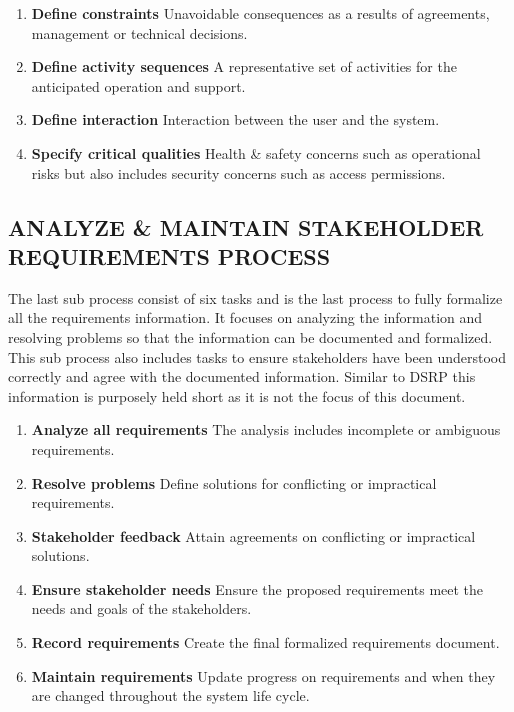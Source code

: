 \documentclass[conference]{IEEEtran}
\begin{document}
\begin{enumerate}
	\item \textbf{Define constraints} Unavoidable consequences as a results of agreements, management or technical decisions.
	\item \textbf{Define activity sequences} A representative set of activities for the anticipated operation and support.
	\item \textbf{Define interaction} Interaction between the user and the system.
	\item \textbf{Specify critical qualities} Health \& safety concerns such as operational risks but also includes security concerns such as access permissions.
\end{enumerate}

\subsection{ANALYZE \& MAINTAIN STAKEHOLDER REQUIREMENTS PROCESS}

The last sub process consist of six tasks and is the last process to fully formalize all the requirements information. It focuses on analyzing the information and resolving problems so that the information can be documented and formalized. This sub process also includes tasks to ensure stakeholders have been understood correctly and agree with the documented information. Similar to DSRP this information is purposely held short as it is not the focus of this document.

\begin{enumerate}
	\item \textbf{Analyze all requirements} The analysis includes incomplete or ambiguous requirements.
	\item \textbf{Resolve problems} Define solutions for conflicting or impractical requirements.
	\item \textbf{Stakeholder feedback} Attain agreements on conflicting or impractical solutions.
	\item \textbf{Ensure stakeholder needs} Ensure the proposed requirements meet the needs and goals of the stakeholders.
	\item \textbf{Record requirements} Create the final formalized requirements document.
	\item \textbf{Maintain requirements} Update progress on requirements and when they are changed throughout the system life cycle.
\end{enumerate}
\end{document}
